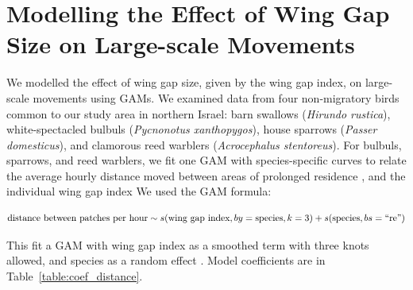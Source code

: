 \section*{Modelling the Effect of Wing Gap Size on Large-scale Movements}

We modelled the effect of wing gap size, given by the wing gap index, on large-scale movements using GAMs.
We examined data from four non-migratory birds common to our study area in northern Israel: barn swallows (\textit{Hirundo rustica}), white-spectacled bulbuls (\textit{Pycnonotus xanthopygos}), house sparrows (\textit{Passer domesticus}), and clamorous reed warblers (\textit{Acrocephalus stentoreus}).
For bulbuls, sparrows, and reed warblers, we fit one GAM with species-specific curves to relate the average hourly distance moved between areas of prolonged residence \parencite[``residence patches''][]{gupte2022d}, and the individual wing gap index
We used the GAM formula:
\begin{linenomath*}
    $$
        \text{distance between patches per hour} \sim s(\text{wing gap index}, by = \text{species}, k = 3) +\\
    s(\text{species}, bs = \text{``re''})      
    $$
\end{linenomath*}
This fit a GAM with wing gap index as a smoothed term with three knots allowed, and species as a random effect \parencite{wood2017}.
Model coefficients are in Table~\ref{table:coef_distance}.

